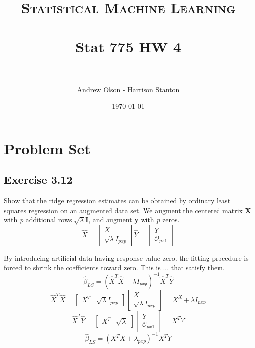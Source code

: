 \documentclass[paper=a4, fontsize=11pt]{scrartcl} %
\title{	
\normalfont \normalsize 
\textsc{Statistical Machine Learning} \\ [25pt] %
\horrule{0.5pt} \\[0.4cm] %
\huge Stat 775 HW 4 \\ %
\horrule{2pt} \\[0.5cm] %
}
\author{Andrew Olson - Harrison Stanton} %
\date{\normalsize\today} %
\numberwithin{equation}{section} %
\numberwithin{figure}{section} %
\numberwithin{table}{section} %
\theoremstyle{statement}
\begin{document}
\maketitle %


\section{Problem Set}
\subsection{Exercise 3.12}
Show that the ridge regression estimates can be obtained by ordinary least squares regression on an augmented data set. We augment the centered matrix \textbf{X} with \textit{p} additional rows $\sqrt{\lambda}$\textbf{I}, and augment \textbf{y} with \textit{p} zeros.\\
\[
    \hat{X} = 
    \begin{bmatrix}
        X\\
        \sqrt{\lambda} I_{pxp}        
    \end{bmatrix}    
    \hat{Y} = 
    \begin{bmatrix}
        Y\\
        \mathcal O_{px1}       
    \end{bmatrix}
\]

By introducing artificial data having response value zero, the fitting procedure is forced to shrink the coefficients toward zero. This is ...  that satisfy them.\\

\[
    \hat{\beta}_{LS} = (\hat{X}^T\hat{X} + \lambda I_{pxp})^{-1}\hat{X}^T\hat{Y}
\]
\[
    \hat{X}^T\hat{X} = 
    \begin{bmatrix}
        X^T & \sqrt{\lambda}I_{pxp}
    \end{bmatrix}
    \begin{bmatrix}
        X\\
        \sqrt{\lambda}I_{pxp}
    \end{bmatrix}
    = X^X + \lambda I_{pxp}
\]
\[
    \hat{X}^T\hat{Y} = 
    \begin{bmatrix}
        X^T & \sqrt{\lambda}
    \end{bmatrix}
    \begin{bmatrix}
        Y\\
        \mathcal{O}_{px1}    
    \end{bmatrix}
    = X^TY
\]
\[
    \hat{\beta}_{LS} = (X^TX + \lambda_{pxp})^{-1}X^TY
\]
\end{document}
